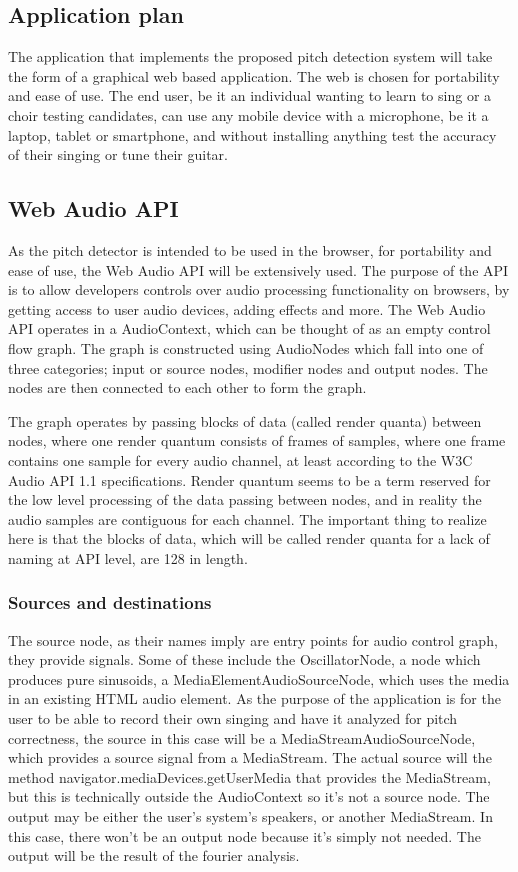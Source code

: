 \subsection{Application plan}
The application that implements the proposed pitch detection system will take the form of a graphical web based application. The web is chosen for portability and ease of use. The end user, be it an individual wanting to learn to sing or a choir testing candidates, can use any mobile device with a microphone, be it a laptop, tablet or smartphone, and without installing anything test the accuracy of their singing or tune their guitar.

\subsection{Web Audio API}
As the pitch detector is intended to be used in the browser, for portability and ease of use, the Web Audio API will be extensively used. The purpose of the API is to allow developers controls over audio processing functionality on browsers, by getting access to user audio devices, adding effects and more. 
The Web Audio API operates in a AudioContext, which can be thought of as an empty control flow graph. The graph is constructed using AudioNodes which fall into one of three categories; input or source nodes, modifier nodes and output nodes. The nodes are then connected to each other to form the graph. 

The graph operates by passing blocks of data (called render quanta) between nodes, where one render quantum consists of frames of samples, where one frame contains one sample for every audio channel, at least according to the W3C Audio API 1.1 specifications. Render quantum seems to be a term reserved for the low level processing of the data passing between nodes, and in reality the audio samples are contiguous for each channel. The important thing to realize here is that the blocks of data, which will be called render quanta for a lack of naming at API level, are 128 in length.


\subsubsection{Sources and destinations}
The source node, as their names imply are entry points for audio control graph, they provide signals. Some of these include the OscillatorNode, a node which produces pure sinusoids, a MediaElementAudioSourceNode, which uses the media in an existing HTML audio element. As the purpose of the application is for the user to be able to record their own singing and have it analyzed for pitch correctness, the source in this case will be a MediaStreamAudioSourceNode, which provides a source signal from a MediaStream. The actual source will the method navigator.mediaDevices.getUserMedia\(\) that provides the MediaStream, but this is technically outside the AudioContext so it's not a source node.  
The output may be either the user's system's speakers, or another MediaStream. In this case, there won't be an output node because it's simply not needed. The output will be the result of the fourier analysis.

